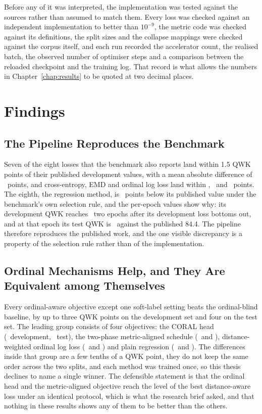Before any of it was interpreted, the implementation was tested against the sources rather than
assumed to match them. Every loss was checked against an independent implementation to better
than $10^{-9}$, the metric code was checked against its definitions, the split sizes and the
collapse mappings were checked against the corpus itself, and each run recorded the accelerator
count, the realised batch, the observed number of optimiser steps and a comparison between the
reloaded checkpoint and the training log. That record is what allows the numbers in
Chapter~\ref{chap:results} to be quoted at two decimal places.

\section{Findings}

\subsection{The Pipeline Reproduces the Benchmark}

Seven of the eight losses that the benchmark also reports land within 1.5 QWK points of their
published development values, with a mean absolute difference of \gapQwkMean\ points, and
cross-entropy, EMD and ordinal log loss land within \gapQwkCE, \gapQwkEMD\ and \gapQwkOLL\
points. The eighth, the regression method, is \gapQwkMSE\ points below its published value under
the benchmark's own selection rule, and the per-epoch values show why: its development QWK
reaches \qwkseldevQwkMSE\ two epochs after its development loss bottoms out, and at that epoch
its test QWK is \qwkseltestQwkMSE\ against the published 84.4. The pipeline therefore
reproduces the published work, and the one visible discrepancy is a property of the selection
rule rather than of the implementation.

\subsection{Ordinal Mechanisms Help, and They Are Equivalent among Themselves}

Every ordinal-aware objective except one soft-label setting beats the ordinal-blind baseline,
by up to three QWK points on the development set and four on the test set. The leading group
consists of four objectives: the CORAL head (\devQwkCoral\ development, \testQwkCoral\ test),
the two-phase metric-aligned schedule (\devQwkSoftqwk\ and \testQwkSoftqwk), distance-weighted
ordinal log loss (\devQwkOLL\ and \testQwkOLL) and plain regression (\devQwkMSE\ and
\testQwkMSE). The differences inside that group are a few tenths of a QWK point, they do not
keep the same order across the two splits, and each method was trained once, so this thesis
declines to name a single winner. The defensible statement is that the ordinal head and the
metric-aligned objective reach the level of the best distance-aware loss under an identical
protocol, which is what the research brief asked, and that nothing in these results shows any
of them to be better than the others.

